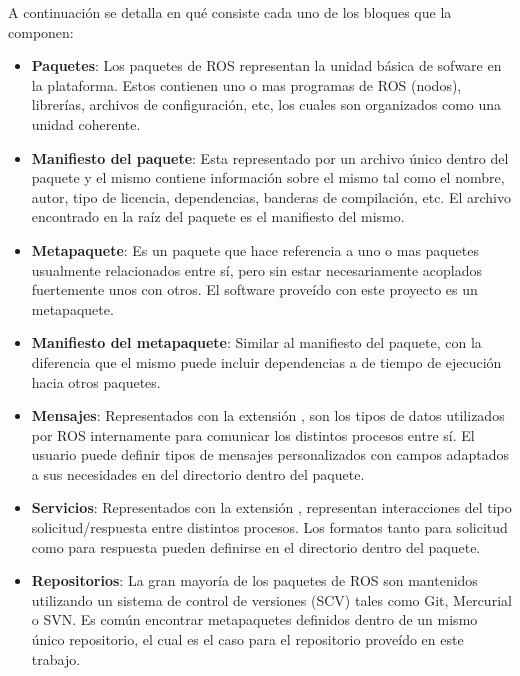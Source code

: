 \newpage
A continuación se detalla en qué consiste cada uno de los bloques que la componen:
\begin{itemize}
    \item \textbf{Paquetes}: Los paquetes de ROS representan la unidad básica de sofware en la plataforma. Estos contienen uno o mas programas de ROS (nodos), librerías, archivos de configuración, etc, los cuales son organizados como una unidad coherente.
    \item \textbf{Manifiesto del paquete}: Esta representado por un archivo único dentro del paquete y el mismo contiene información sobre el mismo tal como el nombre, autor, tipo de licencia, dependencias, banderas de compilación, etc. El archivo  encontrado en la raíz del paquete es el manifiesto del mismo.
    \item \textbf{Metapaquete}: Es un paquete que hace referencia a uno o mas paquetes usualmente relacionados entre sí, pero sin estar necesariamente acoplados fuertemente unos con otros. El software proveído con este proyecto es un metapaquete.
    \item \textbf{Manifiesto del metapaquete}: Similar al manifiesto del paquete, con la diferencia que el mismo puede incluir dependencias a de tiempo de ejecución hacia otros paquetes.
    \item \textbf{Mensajes}: Representados con la extensión , son los tipos de datos utilizados por ROS internamente para comunicar los distintos procesos entre sí. El usuario puede definir tipos de mensajes personalizados con campos adaptados a sus necesidades en del directorio  dentro del paquete.
    \item  \textbf{Servicios}: Representados con la extensión , representan interacciones del tipo solicitud/respuesta entre distintos procesos. Los formatos tanto para solicitud como para respuesta pueden definirse en el directorio  dentro del paquete.
    \item \textbf{Repositorios}: La gran mayoría de los paquetes de ROS son mantenidos utilizando un sistema de control de versiones (SCV) tales como Git, Mercurial o SVN. Es común encontrar metapaquetes definidos dentro de un mismo único repositorio, el cual es el caso para el repositorio proveído en este trabajo.
\end{itemize}

